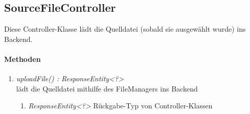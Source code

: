 \subsection{SourceFileController}
Diese Controller-Klasse lädt die Quelldatei (sobald sie ausgewählt wurde) ins Backend.

\paragraph{Methoden}

\begin{enumerate}[+]
	\item \textit{ uploadFile() : ResponseEntity<?>}\\
	 lädt die Quelldatei mithilfe des FileManagers ins Backend
	
	\begin{enumerate}[$\circ$]
		\item \textit{ResponseEntity<?>} Rückgabe-Typ von Controller-Klassen
	\end{enumerate}

\end{enumerate}
